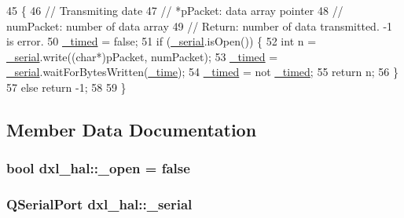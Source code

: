 \begin{DoxyCode}
45 \{
46     \textcolor{comment}{// Transmiting date}
47     \textcolor{comment}{// *pPacket: data array pointer}
48     \textcolor{comment}{// numPacket: number of data array}
49     \textcolor{comment}{// Return: number of data transmitted. -1 is error.}
50     \hyperlink{classdxl__hal_a10d474daa3ca42b5c5ceb6558a955ca1}{\_timed} = \textcolor{keyword}{false};
51     \textcolor{keywordflow}{if} (\hyperlink{classdxl__hal_a785d0e35b81d779b54869cad668f9745}{\_serial}.isOpen()) \{
52         \textcolor{keywordtype}{int} n = \hyperlink{classdxl__hal_a785d0e35b81d779b54869cad668f9745}{\_serial}.write((\textcolor{keywordtype}{char}*)pPacket, numPacket);
53         \hyperlink{classdxl__hal_a10d474daa3ca42b5c5ceb6558a955ca1}{\_timed} = \hyperlink{classdxl__hal_a785d0e35b81d779b54869cad668f9745}{\_serial}.waitForBytesWritten(\hyperlink{classdxl__hal_ae3d8733b5ca778b070218765ca0746ac}{\_time});
54         \hyperlink{classdxl__hal_a10d474daa3ca42b5c5ceb6558a955ca1}{\_timed} = not \hyperlink{classdxl__hal_a10d474daa3ca42b5c5ceb6558a955ca1}{\_timed};
55         \textcolor{keywordflow}{return} n;
56     \}
57     \textcolor{keywordflow}{else} \textcolor{keywordflow}{return} -1;
58 
59 \}
\end{DoxyCode}


\subsection{Member Data Documentation}
\hypertarget{classdxl__hal_a04831154c43fe4f7499ea0950e0f0999}{}
\subsubsection[{\+\_\+open}]{\setlength{\rightskip}{0pt plus 5cm}bool dxl\+\_\+hal\+::\+\_\+open = false\hspace{0.3cm}{\ttfamily [private]}}\label{classdxl__hal_a04831154c43fe4f7499ea0950e0f0999}
\hypertarget{classdxl__hal_a785d0e35b81d779b54869cad668f9745}{}
\subsubsection[{\+\_\+serial}]{\setlength{\rightskip}{0pt plus 5cm}Q\+Serial\+Port dxl\+\_\+hal\+::\+\_\+serial\hspace{0.3cm}{\ttfamily [private]}}\label{classdxl__hal_a785d0e35b81d779b54869cad668f9745}
\hypertarget{classdxl__hal_ae3d8733b5ca778b070218765ca0746ac}{}
